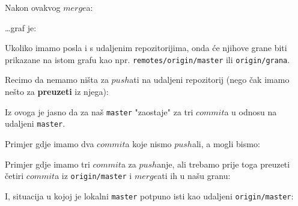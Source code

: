 
Nakon ovakvog $merge$a:



\dots{}graf je:



Ukoliko imamo posla i s udaljenim repozitorijima, onda će njihove grane biti prikazane na istom grafu kao npr. \verb+remotes/origin/master+ ili \verb+origin/grana+.

Recimo da nemamo ništa za $push$ati na udaljeni repozitorij (nego čak imamo nešto za \textbf{preuzeti} iz njega):


Iz ovoga je jasno da za naš \verb+master+ "zaostaje" za tri $commit$a u odnosu na udaljeni \verb+master+.

Primjer gdje imamo dva $commit$a koje nismo $push$ali, a mogli bismo:


Primjer gdje imamo tri $commit$a za $push$anje, ali trebamo prije toga preuzeti četiri $commit$a iz \verb+origin/master+ i $merge$ati ih u našu granu:


I, situacija u kojoj je lokalni \verb+master+ potpuno isti kao udaljeni \verb+origin/master+:


